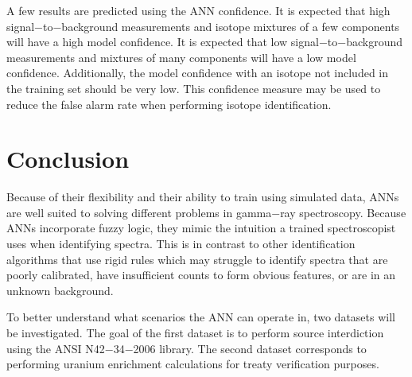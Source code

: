 \documentclass[tocnosub,noragright,centerchapter,12pt,fullpage]{uiucecethesis09}
\begin{document}
A few results are predicted using the ANN confidence. It is expected that high signal$-$to$-$background measurements and isotope mixtures of a few components will have a high model confidence. It is expected that low signal$-$to$-$background measurements and mixtures of many components will have a low model confidence. Additionally, the model confidence with an isotope not included in the training set should be very low. This confidence measure may be used to reduce the false alarm rate when performing isotope identification. 
 \fi





\chapter{Conclusion}

Because of their flexibility and their ability to train using simulated data, ANNs are well suited to solving different problems in gamma$-$ray spectroscopy. Because ANNs incorporate fuzzy logic, they mimic the intuition a trained spectroscopist uses when identifying spectra. This is in contrast to other identification algorithms that use rigid rules which may struggle to identify spectra that are poorly calibrated, have insufficient counts to form obvious features, or are in an unknown background. 

To better understand what scenarios the ANN can operate in, two datasets will be investigated. The goal of the first dataset is to perform source interdiction using the ANSI N42$-$34$-$2006 library. The second dataset corresponds to performing uranium enrichment calculations for treaty verification purposes. %
\end{document}
